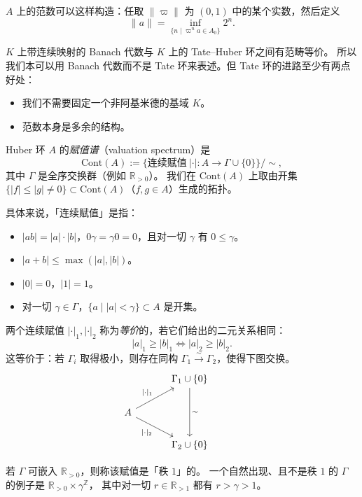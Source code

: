 $A$ 上的范数可以这样构造：任取 $\|\varpi\|$ 为 $(0,1)$ 中的某个实数，然后定义
\[
\|a\|=\inf_{\{n\mid\varpi^na\in A_0\}}2^n .
\]

$K$ 上带连续映射的 Banach 代数与 $K$ 上的 Tate--Huber 环之间有范畴等价。
所以我们本可以用 Banach 代数而不是 Tate 环来表述。但 Tate 环的进路至少有两点好处：
\begin{itemize}
  \item 我们不需要固定一个非阿基米德的基域 $K$。
  \item {}范数本身是多余的结构。
\end{itemize}

\begin{definition}
Huber 环 $A$ 的\emph{赋值谱}（valuation spectrum）是
\[
\mathrm{Cont}(A):=\{\text{连续赋值}\ |\cdot|:A\to\Gamma\cup\{0\}\}/\sim,
\]
其中 $\Gamma$ 是全序交换群（例如 $\mathbb{R}_{>0}$）。
我们在 $\mathrm{Cont}(A)$ 上取由开集 $\{|f|\le|g|\ne0\}\subset\mathrm{Cont}(A)$（$f,g\in A$）生成的拓扑。
\end{definition}

具体来说，「连续赋值」是指：
\begin{itemize}
  \item $|ab|=|a|\cdot|b|$，$0\gamma=\gamma0=0$，且对一切 $\gamma$ 有 $0\le\gamma$。
  \item $|a+b|\le\max(|a|,|b|)$。
  \item $|0|=0$，$|1|=1$。
  \item 对一切 $\gamma\in\Gamma$，$\{a\mid |a|<\gamma\}\subset A$ 是开集。
\end{itemize}

两个连续赋值 $|\cdot|_1,|\cdot|_2$ 称为\emph{等价}的，若它们给出的二元关系相同：
\[
|a|_1\ge|b|_1\iff|a|_2\ge|b|_2 .
\]
这等价于：若 $\Gamma_i$ 取得极小，则存在同构 $\Gamma_1\xrightarrow{\sim}\Gamma_2$，使得下图交换。
\[
\begin{tikzcd}[column sep=3.2em, row sep=1.8em]
  & \Gamma_1\cup\{0\} \arrow[dd, "\sim"] & \\
A \arrow[ru, "|\cdot|_1"] \arrow[rd, "|\cdot|_2"'] & & \\
  & \Gamma_2\cup\{0\} &
\end{tikzcd}
\]

\begin{example}
若 $\Gamma$ 可嵌入 $\mathbb{R}_{>0}$，则称该赋值是「秩 $1$」的。
一个自然出现、且不是秩 $1$ 的 $\Gamma$ 的例子是 $\mathbb{R}_{>0}\times\gamma^{\mathbb{Z}}$，
其中对一切 $r\in\mathbb{R}_{>1}$ 都有 $r>\gamma>1$。
\end{example}

